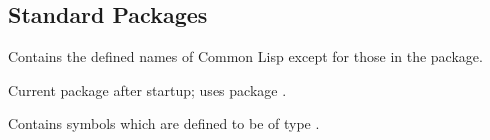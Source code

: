 \subsection[Std Packages]{Standard Packages}
\begin{LIST}{1cm}

  {
  Contains the defined names of Common Lisp except for those in the
   package.
  }

  {
    Current package after startup; uses package . 
  }

  {
    Contains symbols which are defined to be of type .
  }

\end{LIST}
